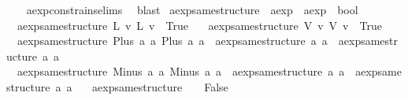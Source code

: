 \begin{isabellebody}
%
\isadelimproof
\ \ %
\endisadelimproof
%
\isatagproof
{}\isamarkupfalse%
\ aexp{\isacharunderscore}constrains{\isachardot}elims{\isacharparenleft}{}{\isacharparenright}\ \isamarkupfalse%
\ blast%
\endisatagproof
{\isafoldproof}%
%
\isadelimproof
\isanewline
%
\endisadelimproof
\isanewline
{}\isamarkupfalse%
\ aexp{\isacharunderscore}same{\isacharunderscore}structure\ {\isacharcolon}{\isacharcolon}\ {\isachardoublequoteopen}aexp\ {\isasymRightarrow}\ aexp\ {\isasymRightarrow}\ bool{\isachardoublequoteclose}\ \isanewline
\ \ {\isachardoublequoteopen}aexp{\isacharunderscore}same{\isacharunderscore}structure\ {\isacharparenleft}L\ v{\isacharparenright}\ {\isacharparenleft}L\ v{\isacharprime}{\isacharparenright}\ {\isacharequal}\ True{\isachardoublequoteclose}\ {\isacharbar}\isanewline
\ \ {\isachardoublequoteopen}aexp{\isacharunderscore}same{\isacharunderscore}structure\ {\isacharparenleft}V\ v{\isacharparenright}\ {\isacharparenleft}V\ v{\isacharprime}{\isacharparenright}\ {\isacharequal}\ True{\isachardoublequoteclose}\ {\isacharbar}\isanewline
\ \ {\isachardoublequoteopen}aexp{\isacharunderscore}same{\isacharunderscore}structure\ {\isacharparenleft}Plus\ a{}\ a{}{\isacharparenright}\ {\isacharparenleft}Plus\ a{}{\isacharprime}\ a{}{\isacharprime}{\isacharparenright}\ {\isacharequal}\ {\isacharparenleft}aexp{\isacharunderscore}same{\isacharunderscore}structure\ a{}\ a{}{\isacharprime}\ {\isasymand}\ aexp{\isacharunderscore}same{\isacharunderscore}structure\ a{}\ a{}{\isacharprime}{\isacharparenright}{\isachardoublequoteclose}\ {\isacharbar}\isanewline
\ \ {\isachardoublequoteopen}aexp{\isacharunderscore}same{\isacharunderscore}structure\ {\isacharparenleft}Minus\ a{}\ a{}{\isacharparenright}\ {\isacharparenleft}Minus\ a{}{\isacharprime}\ a{}{\isacharprime}{\isacharparenright}\ {\isacharequal}\ {\isacharparenleft}aexp{\isacharunderscore}same{\isacharunderscore}structure\ a{}\ a{}{\isacharprime}\ {\isasymand}\ aexp{\isacharunderscore}same{\isacharunderscore}structure\ a{}\ a{}{\isacharprime}{\isacharparenright}{\isachardoublequoteclose}\ {\isacharbar}\isanewline
\ \ {\isachardoublequoteopen}aexp{\isacharunderscore}same{\isacharunderscore}structure\ {\isacharunderscore}\ {\isacharunderscore}\ {\isacharequal}\ False{\isachardoublequoteclose}\isanewline
%
\isadelimtheory
\isanewline
%
\endisadelimtheory
%
\isatagtheory
{}\isamarkupfalse%
%
\endisatagtheory
{\isafoldtheory}%
%
\isadelimtheory
%
\endisadelimtheory
%
\end{isabellebody}%
